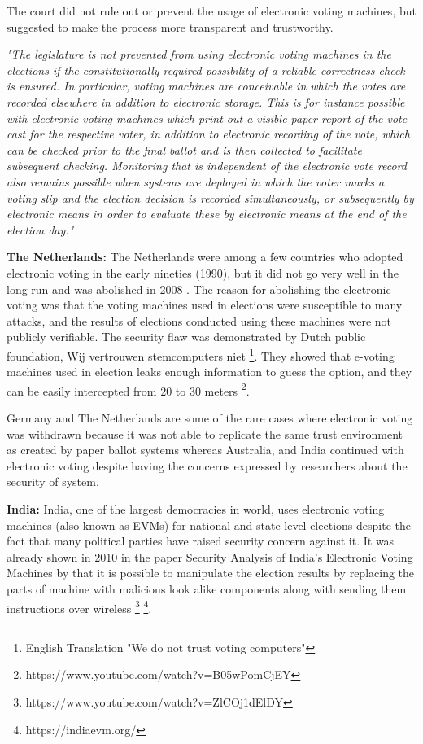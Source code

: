   \noindent	
  The court did not rule out or prevent the usage of electronic 
  voting machines,  but suggested to make the process more 
  transparent and trustworthy.  
  
  \textit{"The legislature is not prevented from using electronic voting machines 
  in the elections if the constitutionally required possibility of a 
  reliable correctness check is ensured. In particular, voting machines 
  are conceivable in which the votes are recorded elsewhere in addition
   to electronic storage. This is for instance possible with electronic
   voting machines which print out a visible paper report of the vote 
   cast for the respective voter, in addition to electronic recording 
   of the vote, which can be checked prior to the final ballot and is
    then collected to facilitate subsequent checking. Monitoring that is
     independent of the electronic vote record also remains possible when
     systems are deployed in which the voter marks a voting slip and the 
     election decision is recorded simultaneously, 
     or subsequently by electronic means in 
     order to evaluate these by electronic means at the end of the 
     election day."}
  
  \textbf{The Netherlands:}
  The Netherlands were among a few countries who adopted electronic voting 
  in the early nineties (1990), but it did not go very well in the long 
  run and was abolished in 2008 \citep{Jacobs2009}. 
  The reason for abolishing the electronic voting was that   
  the voting machines used in elections were susceptible to many attacks,
  and the results of elections conducted using these machines 
  were not publicly verifiable.  The security flaw was demonstrated by 
  Dutch public foundation, Wij vertrouwen stemcomputers niet
  \footnote{English Translation "We do not trust voting computers"}. 
  They showed that e-voting machines used in election leaks enough
  information to guess the option, 
  and they can be easily intercepted from 20 to 30 meters
  \footnote{https://www.youtube.com/watch?v=B05wPomCjEY}. 
  
  
  Germany and The Netherlands are some of the rare cases where 
  electronic voting was withdrawn because it was not able to 
  replicate the same trust environment as created by paper 
  ballot systems whereas Australia, and India continued 
  with electronic voting despite having the concerns expressed 
  by researchers about the security of system. 
  
  \textbf{India:}
  India, one of the largest democracies in world, 
  uses electronic voting machines (also known as EVMs) for national 
  and state level  elections despite the fact that many political parties have raised security 
  concern against it. It was already shown in 2010 in the paper 
  Security Analysis of India's Electronic Voting Machines by 
  \cite{Wolchok:2010:SAI:1866307.1866309}  that it 
  is possible to manipulate the election results by replacing the 
  parts of machine with malicious look alike components along with sending 
  them instructions over wireless
  \footnote{https://www.youtube.com/watch?v=ZlCOj1dElDY} 
  \footnote{https://indiaevm.org/}. 
  
